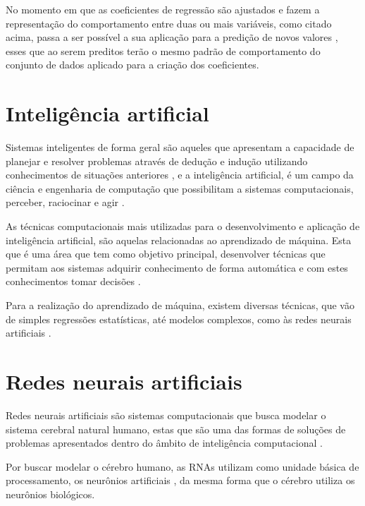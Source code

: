 \par No momento em que as coeficientes de regressão são ajustados e fazem a representação do comportamento entre duas ou mais variáveis, como citado acima, passa a ser possível a sua aplicação para a predição de novos valores \cite{introDataMining2009}, esses que ao serem preditos terão o mesmo padrão de comportamento do conjunto de dados aplicado para a criação dos coeficientes.

\section{Inteligência artificial}

\par Sistemas inteligentes de forma geral são aqueles que apresentam a capacidade de planejar e resolver problemas através de dedução e indução utilizando conhecimentos de situações anteriores \cite{VonZuben2013}, e a inteligência artificial, é um campo da ciência e engenharia de computação \cite{VonZuben2013} que possibilitam a sistemas computacionais, perceber, raciocinar e agir \cite{Winston1992}.

\par As técnicas computacionais mais utilizadas para o desenvolvimento e aplicação de inteligência artificial, são aquelas relacionadas ao aprendizado de máquina. Esta que é uma área que tem como objetivo principal, desenvolver técnicas que permitam aos sistemas adquirir conhecimento de forma automática e com estes conhecimentos tomar decisões \cite{Augusto2007}.

\par Para a realização do aprendizado de máquina, existem diversas técnicas, que vão de simples regressões estatísticas, até modelos complexos, como às redes neurais artificiais \cite{andrewngcourse}.

\section{Redes neurais artificiais}

\par Redes neurais artificiais são sistemas computacionais que busca modelar o sistema cerebral natural humano, estas que são uma das formas de soluções de problemas apresentados dentro do âmbito de inteligência computacional \cite{Cintra2019}.

\par Por buscar modelar o cérebro humano, as RNAs utilizam como unidade básica de processamento, os neurônios artificiais \cite{Haykin2001}, da mesma forma que o cérebro utiliza os neurônios biológicos. %

